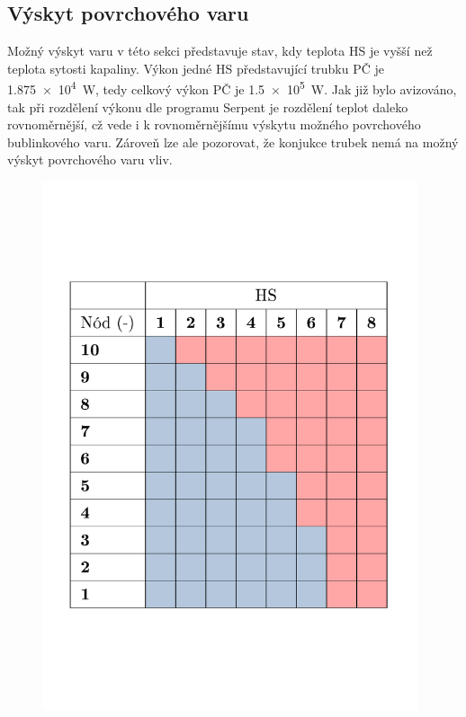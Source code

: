 \subsection{Výskyt povrchového varu}
\label{subsec:nat_conv_var}
Možný výskyt varu v této sekci představuje stav, kdy teplota HS je vyšší než teplota sytosti kapaliny. Výkon jedné HS představující trubku PČ je \SI{1,875e4}{\watt}, tedy celkový výkon PČ je \SI{1,5e5}{\watt}.
Jak již bylo avizováno, tak při rozdělení výkonu dle programu Serpent je rozdělení teplot daleko rovnoměrnější, cž vede i k rovnoměrnějšímu výskytu možného povrchového bublinkového varu. Zároveň lze ale pozorovat, že konjukce trubek nemá na možný výskyt povrchového varu vliv.
\begin{figure}[H]
	\centering
	\begin{minipage}{.5\textwidth}
		\centering
		\includegraphics[width=0.98\textwidth, trim={1cm 5.5cm 0.5cm 5.5cm}, clip]{./04_TH_model_IRT/grafy/var_rovn_komplex.pdf}

\end{minipage}
\end{figure}

